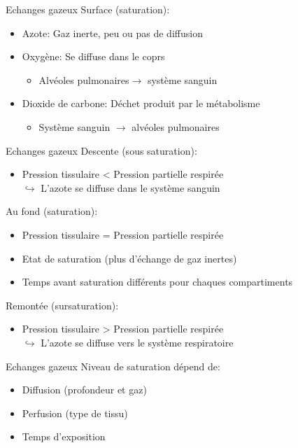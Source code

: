 \begin{frame}{Echanges gazeux}  
	Surface (saturation):
	\begin{itemize}
		\item Azote: Gaz inerte, peu ou pas de diffusion
		\item Oxygène: Se diffuse dans le coprs
		\begin{itemize}
			\item  Alvéoles pulmonaires$\rightarrow$  système sanguin
		\end{itemize}
		\item Dioxide de carbone: Déchet produit par le métabolisme
		\begin{itemize}
			\item Système sanguin $\rightarrow$  alvéoles pulmonaires
		\end{itemize}
	\end{itemize}
\end{frame}

\begin{frame}{Echanges gazeux}  
	Descente (sous saturation):
	\begin{itemize}
		\item Pression tissulaire < Pression partielle respirée\\
				$\hookrightarrow$ L'azote se diffuse dans le système sanguin
	\end{itemize}
	\vfill
	Au fond (saturation):
	\begin{itemize}
		\item Pression tissulaire = Pression partielle respirée
		\item Etat de saturation (plus d'échange de gaz inertes)
		\item Temps avant saturation différents pour chaques compartiments
	\end{itemize}
	\vfill
	Remontée (sursaturation):
	\begin{itemize}
		\item Pression tissulaire > Pression partielle respirée\\
				$\hookrightarrow$ L'azote se diffuse vers le système respiratoire
	\end{itemize}
\end{frame}

\begin{frame}{Echanges gazeux}  
	Niveau de saturation dépend de:
	\begin{itemize}
		\item Diffusion (profondeur et gaz)
		\item Perfusion (type de tissu)
		\item Temps d'exposition
	\end{itemize}
\end{frame}

